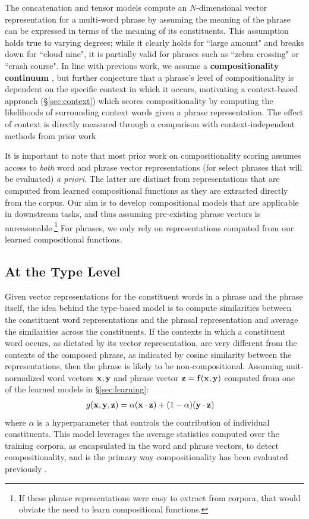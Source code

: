 \documentclass[11pt,letterpaper]{article}
\newcommand{\bX}{{\bf x}}
\newcommand{\bY}{{\bf y}}
\newcommand{\bZ}{{\bf z}}
\newcommand{\bF}{{\bf f}}
\begin{document}
The concatenation and tensor models compute an $N$-dimensional vector representation for a multi-word phrase by assuming the meaning of the phrase can be expressed in terms of the meaning of its constituents. 
This assumption holds true to varying degrees; while it clearly holds for ``large amount" and breaks down for ``cloud nine", it is partially valid for phrases such as ``zebra crossing" or ``crash course". 
In line with previous work, we assume a {\bf compositionality continuum} \cite{McCarthy2003}, but further conjecture that a phrase's level of compositionality is dependent on the specific context in which it occurs,  motivating a context-based approach (\S\ref{sec:context}) which scores compositionality by computing the likelihoods of surrounding context words given a phrase representation. 
The effect of context is directly measured through a comparison with context-independent methods from prior work \cite{Bannard2003,Reddy2011}

It is important to note that most prior work on compositionality scoring assumes access to \emph{both} word and phrase vector representations (for select phrases that will be evaluated) \emph{a priori}.  
The latter are distinct from representations that are computed from learned compositional functions as they are extracted directly from the corpus. 
Our aim is to develop compositional models that are applicable in downstream tasks, and thus assuming pre-existing phrase vectors is unreasonable.\footnote{If these phrase representations were easy to extract from corpora, that would obviate the need to learn compositional functions.}
For phrases, we only rely on representations computed from our learned compositional functions. 

\subsection{At the Type Level}
\label{sec:independent}

Given vector representations for the constituent words in a phrase and the phrase itself, the idea behind the type-based model is to compute similarities between the constituent word representations and the phrasal representation and average the similarities across the constituents. 
If the contexts in which a constituent word occurs, as dictated by its vector representation, are very different from the contexts of the composed phrase, as indicated by cosine similarity between the representations, then the phrase is likely to be non-compositional. 
Assuming unit-normalized word vectors $\bX, \bY$ and phrase vector $\bZ = \bF(\bX, \bY)$ computed from one of the learned models in \S\ref{sec:learning}:
\begin{align}
	g(\bX, \bY, \bZ) &= \alpha (\bX \cdot \bZ) + (1-\alpha)(\bY \cdot \bZ)
	\label{eq:cosine-sim}
\end{align}
where $\alpha$ is a hyperparameter that controls the contribution of individual constituents. 
This model leverages the average statistics computed over the training corpora, as encapsulated in the word and phrase vectors, to detect compositionality, and is the primary way compositionality has been evaluated previously \cite{Reddy2011,Kiela2013}. 
\end{document}

